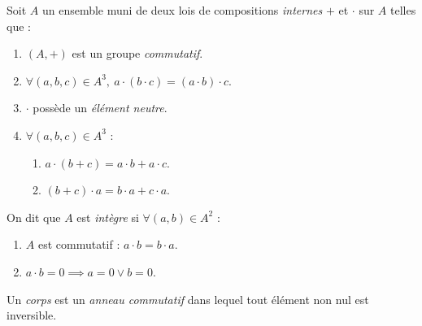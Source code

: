 \begin{definition}[Anneau]
	Soit $A$ un ensemble muni de deux lois de compositions \emph{internes} \og $+$ \fg et \og $\cdot$ \fg sur $A$ telles que : 
	\begin{multicols}{2}
		\begin{enumerate}
			\item $(A, +)$ est un groupe \emph{commutatif}.
			\item $\forall (a, b, c) \in A^3,\ a \cdot (b \cdot c) = (a \cdot b) \cdot c$.
			\item \og $\cdot$ \fg possède un \emph{élément neutre}.
			\item $\forall (a, b, c ) \in A^3$ : 
			\begin{enumerate}
				\item $a \cdot (b + c) = a \cdot b + a \cdot c$.
				\item $(b + c) \cdot a = b \cdot a + c \cdot a$.
			\end{enumerate}
		\end{enumerate}
	\end{multicols}
	\noindent On dit que $A$ est \emph{intègre} si $\forall (a, b) \in A^2$ :
	\begin{multicols}{2}
		\begin{enumerate}
			\item $A$ est commutatif : $a \cdot b = b \cdot a$.
			\item $a \cdot b = 0 \implies a = 0 \lor b = 0$.
		\end{enumerate}
	\end{multicols}
\end{definition}

\begin{definition}[Corps]
    Un \emph{corps} est un \emph{anneau commutatif} dans lequel tout élément non nul est inversible.
\end{definition}

